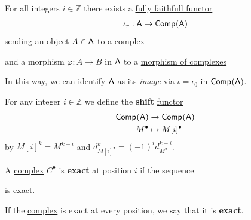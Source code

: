 \documentclass[../../../main]{subfiles}
\begin{document}
\begin{remark} \label{remark:inclussion-into-complex}
  For all integers \(i \in \mathbb{Z}\) there exists a \hyperref[def:functor-types]{fully faithfull functor}
  \begin{align*}
    \iota_{r}: \mathsf{A} \to \mathsf{Comp}^{}(\mathsf{A})
  \end{align*}
  sending an object \(A \in \mathsf{A}\) to a \hyperref[def:complex]{complex}
  \begin{center}
  \end{center}
  and a morphism \(\varphi: A \to B\) in \(\mathsf{A}\) to a \hyperref[def:complex-morphism]{morphism of complexes}
  \begin{center}
  \end{center}

  In this way, we can identify \(\mathsf{A}\) as its \textit{image} via \(\iota = \iota_{0}\) in \(\mathsf{Comp}^{}(\mathsf{A})\).
\end{remark}

\begin{definition} \label{def:shift-functor}
  For any integer \(i \in \mathbb{Z}\) we define the \textbf{shift} \hyperref[def:functor]{functor}
  \begin{align*}
    \mathsf{Comp}^{}(\mathsf{A}) &\to \mathsf{Comp}^{}(\mathsf{A}) \\
    M^{\bullet} &\mapsto M[i]^{\bullet}
  \end{align*}
  by \(M[i]^{k} = M^{k+i}\) and \(d_{M[i]^{\bullet}}^{k} = (-1)^{i}d_{M^{\bullet}}^{k + i}\).
\end{definition}

\begin{definition} \label{def:exact-complex}
  A \hyperref[def:complex]{complex} \(C^{\bullet}\) is \textbf{exact} at position \(i\) if the sequence
  \begin{center}
  \end{center}
  is \hyperref[def:exact-sequence]{exact}.

  If the \hyperref[def:complex]{complex} is exact at every position, we say that it is \textbf{exact}.
\end{definition}
\end{document}
